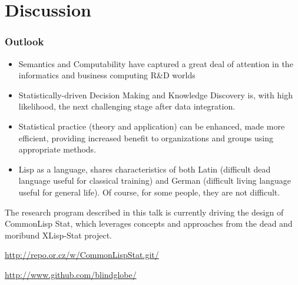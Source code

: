 \documentclass{beamer}
\begin{document}
\section{Discussion}

\begin{frame}
  \frametitle{Outlook}
  \begin{itemize}
  \item Semantics and Computability have captured a great deal of
    attention in the informatics and business computing R\&D worlds
  \item Statistically-driven Decision Making and Knowledge Discovery
    is, with high likelihood, the next challenging stage after data
    integration.
  \item Statistical practice (theory and application) can be enhanced,
    made more efficient, providing  increased benefit to organizations
    and groups using appropriate methods.
  \item Lisp as a language, shares characteristics of both Latin
    (difficult dead language useful for classical training) and German
    (difficult living language useful for general life).  Of course,
    for some people, they are not difficult.
  \end{itemize}

  The research program described in this talk is currently driving the
  design of CommonLisp Stat, which leverages concepts and approaches
  from the dead and moribund XLisp-Stat project.

  \url{http://repo.or.cz/w/CommonLispStat.git/}

  \url{http://www.github.com/blindglobe/}

\end{frame}
\end{document}

